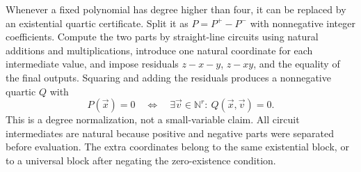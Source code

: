 \documentclass[11pt,letterpaper]{article}
\theoremstyle{definition}
\theoremstyle{remark}
\newcommand{\N}{\mathbb N}
\newcommand{\1}{\mathbf 1}
\begin{document}
Whenever a fixed polynomial has degree higher than four, it can be replaced
by an existential quartic certificate. Split it as $P=P^+-P^-$ with
nonnegative integer coefficients. Compute the two parts by straight-line
circuits using natural additions and multiplications, introduce one natural
coordinate for each intermediate value, and impose residuals
$z-x-y$, $z-xy$, and the equality of the final outputs. Squaring and adding
the residuals produces a nonnegative quartic $Q$ with
\begin{equation}\label{lbh:eq:degree-reduction}
 P(\vec x)=0\quad\Longleftrightarrow\quad
 \exists\vec v\in\N^r:\ Q(\vec x,\vec v)=0.
\end{equation}
This is a degree normalization, not a small-variable claim. All circuit
intermediates are natural because positive and negative parts were separated
before evaluation. The extra coordinates belong to the same existential
block, or to a universal block after negating the zero-existence condition.
\end{document}
